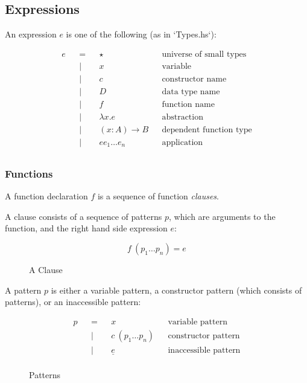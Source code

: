 \documentclass[acmsmall]{acmart}
\begin{document}
\subsection{Expressions}

An expression $e$ is one of the following (as in `Types.hs`):

\begin{equation*}
  \begin{aligned}
    e &  & = &  & \star           &  & \textrm{universe of small types} \\
      &  & | &  & x               &  & \textrm{variable}                \\
      &  & | &  & c               &  & \textrm{constructor name}        \\
      &  & | &  & D               &  & \textrm{data type name}          \\
      &  & | &  & f               &  & \textrm{function name}           \\
      &  & | &  & \lambda x.e     &  & \textrm{abstraction}             \\
      &  & | &  & (x:A) \to B     &  & \textrm{dependent function type} \\
      &  & | &  & e e_1 \dots e_n &  & \textrm{application}             \\
  \end{aligned}
\end{equation*}

\subsubsection{Functions}

A function declaration $f$ is a sequence of function \textit{clauses}. 

A clause consists of a sequence of \textrm{patterns} $p$, which are
arguments to the function, and the right hand side expression $e$:  

\begin{figure}[H]
  \begin{equation*}
    f \: (p_1 \dots p_n) = e
  \end{equation*}
  \caption{A Clause}
\end{figure}

A pattern $p$ is either a variable pattern, a constructor pattern (which
consists of patterns), or an inaccessible pattern:

\begin{figure}[H]
  \begin{equation*}
    \begin{aligned}
      p &  & = &  & x                    &  & \textrm{variable pattern}     \\
        &  & | &  & c \: (p_1 \dots p_n) &  & \textrm{constructor pattern}  \\
        &  & | &  & \underline{e}        &  & \textrm{inaccessible pattern} \\
    \end{aligned}
  \end{equation*}
  \caption{Patterns}
\end{figure}
\end{document}
